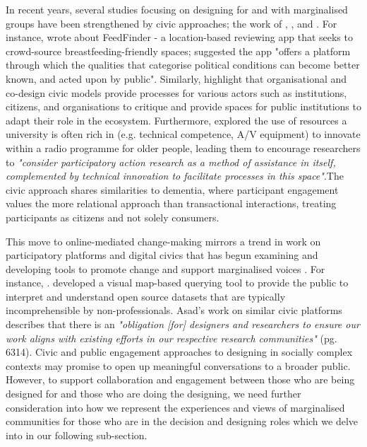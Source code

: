 In recent years, several studies focusing on designing for and with marginalised groups have been strengthened by civic approaches; the work of  \cite{corbett_exploring_2018}, \cite{asad_tap_2017}, and \cite{olivier_digital_2015}. For instance, \cite{balaam_feedfinder_2015} wrote about FeedFinder - a location-based reviewing app that seeks to crowd-source breastfeeding-friendly spaces; suggested the app "offers a platform through which the qualities that categorise political conditions can become better known, and acted upon by public". Similarly, \cite{cazacu2020empowerment} highlight that organisational and co-design civic models provide processes for various actors such as institutions, citizens, and organisations to critique and provide spaces for public institutions to adapt their role in the ecosystem. Furthermore, \cite{reuter_older_2019} explored the use of resources a university is often rich in (e.g. technical competence, A/V equipment) to innovate within a radio programme for older people, leading them to encourage researchers to \textit{"consider participatory action research as a method of assistance in itself, complemented by technical innovation to facilitate processes in this space"}.The civic approach shares similarities to dementia, where participant engagement values the more relational approach than transactional interactions, treating participants as citizens and not solely consumers. 

This move to online-mediated change-making mirrors a trend in work on participatory platforms and digital civics that has begun examining and developing tools to promote change and support marginalised voices \citep{corbett_exploring_2018}. For instance, \cite{puussaar2018making}. developed a visual map-based querying tool to provide the public to interpret and understand open source datasets that are typically incomprehensible by non-professionals. Asad's work on similar civic platforms describes that there is an \textit{"obligation [for] designers and researchers to ensure our work aligns with existing efforts in our respective research communities"} \citep{asad_tap_2017} (pg. 6314). Civic and public engagement approaches to designing in socially complex contexts may promise to open up meaningful conversations to a broader public. However, to support collaboration and engagement between those who are being designed for and those who are doing the designing, we need further consideration into how we represent the experiences and views of marginalised communities for those who are in the decision and designing roles which we delve into in our following sub-section.

